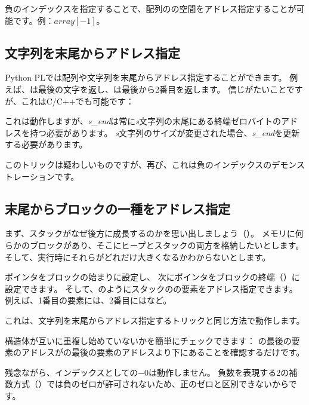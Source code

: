 \label{negative_array_indices}

負のインデックスを指定することで、配列のの空間をアドレス指定することが可能です。例：$array[-1]$。

\subsection{文字列を末尾からアドレス指定}

Python \ac{PL}では配列や文字列を末尾からアドレス指定することができます。
例えば、は最後の文字を返し、は最後から2番目を返します。
信じがたいことですが、これはC/C++でも可能です：



これは動作しますが、\textit{s\_end}は常に\textit{s}文字列の末尾にある終端ゼロバイトのアドレスを持つ必要があります。
\textit{s}文字列のサイズが変更された場合、\textit{s\_end}を更新する必要があります。

このトリックは疑わしいものですが、再び、これは負のインデックスのデモンストレーションです。

\subsection{末尾からブロックの一種をアドレス指定}

まず、スタックがなぜ後方に成長するのかを思い出しましょう（）。
メモリに何らかのブロックがあり、そこにヒープとスタックの両方を格納したいとします。そして、実行時にそれらがどれだけ大きくなるかわからないとします。

ポインタをブロックの始まりに設定し、
次にポインタをブロックの終端（）に設定できます。
そして、のようにスタックのの要素をアドレス指定できます。
例えば、1番目の要素には、2番目にはなど。

これは、文字列を末尾からアドレス指定するトリックと同じ方法で動作します。

構造体が互いに重複し始めていないかを簡単にチェックできます：
の最後の要素のアドレスがの最後の要素のアドレスより下にあることを確認するだけです。

残念ながら、インデックスとしての$-0$は動作しません。
負数を表現する2の補数方式（）では負のゼロが許可されないため、正のゼロと区別できないからです。

